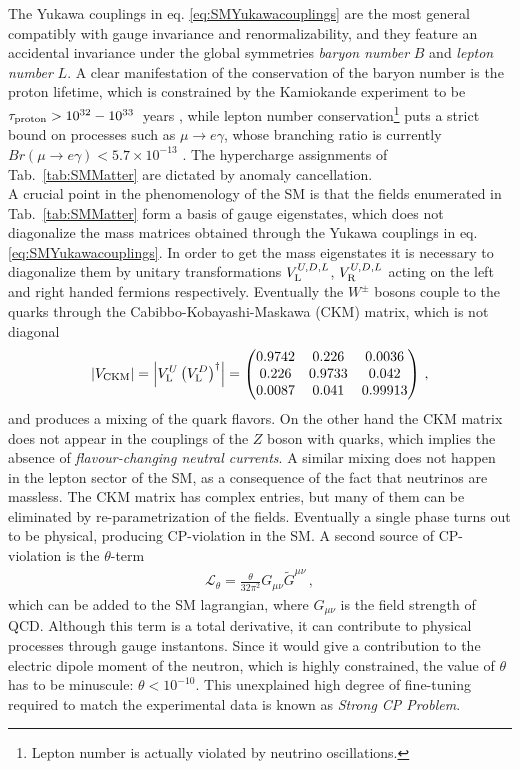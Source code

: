 \documentclass[12pt,a4paper]{book}
\begin{document}
The Yukawa couplings in eq. \eqref{eq:SMYukawacouplings} are the most general compatibly with gauge invariance and renormalizability, and they feature an accidental invariance under the global symmetries \textit{baryon number} $B$ and \textit{lepton number} $L$. A clear manifestation of the conservation of the baryon number is the proton lifetime, which is constrained by the Kamiokande experiment to be $\tau_{\rm proton} > 10^{32}-10^{33} \,$ years \cite{Hirata:1989kn}, while lepton number conservation\footnote{Lepton number is actually violated by neutrino oscillations.} puts a strict bound on processes such as $\mu \rightarrow e \gamma$, whose branching ratio is currently $Br(\mu \rightarrow e \gamma) < 5.7 \times 10^{-13}$ \cite{Adam:2013mnn}. The hypercharge assignments of Tab.~\ref{tab:SMMatter} are dictated by anomaly cancellation.\\

A crucial point in the phenomenology of the SM is that the fields enumerated in Tab.~\ref{tab:SMMatter} form a basis of gauge eigenstates, which does not diagonalize the mass matrices obtained through the Yukawa couplings in eq. \eqref{eq:SMYukawacouplings}. In order to get the mass eigenstates it is necessary to diagonalize them by unitary transformations $V_{\rm L}^{U, D, L}$, $V_{\rm R}^{U, D, L}$ acting on the left and right handed fermions respectively. Eventually the $W^\pm$ bosons couple to the quarks through the Cabibbo-Kobayashi-Maskawa (CKM) matrix, which is not diagonal
\begin{align}
\label{eq:CKM}
\left|V_{\rm CKM}\right| = \left|V^U_{\rm L} \left(V_{\rm L}^D\right)^\dagger \right| = \begin{pmatrix} 0.9742 & 0.226 & 0.0036 \\ 0.226 & 0.9733 & 0.042 \\ 0.0087 & 0.041 & 0.99913 \end{pmatrix}\,,
\end{align}
and produces a mixing of the quark flavors. On the other hand the CKM matrix does not appear in the couplings of the $Z$ boson with quarks, which implies the absence of \textit{flavour-changing neutral currents}. A similar mixing does not happen in the lepton sector of the SM, as a consequence of the fact that neutrinos are massless. The CKM matrix has complex entries, but many of them can be eliminated by re-parametrization of the fields. Eventually a single phase turns out to be physical, producing CP-violation in the SM. A second source of CP-violation is the $\theta$-term
\begin{align}
\label{eq:ThetaTerm}
\mathcal{L_{\theta}} = \frac{\theta}{32 \pi^2} G_{\mu \nu} \tilde{G}^{\mu \nu} \,,
\end{align}
which can be added to the SM lagrangian, where $G_{\mu \nu}$ is the field strength of QCD. Although this term is a total derivative, it can contribute to physical processes through gauge instantons. Since it would give a contribution to the electric dipole moment of the neutron, which is highly constrained, the value of $\theta$ has to be minuscule: $\theta < 10^{-10}$. This unexplained high degree of fine-tuning required to match the experimental data is known as \textit{Strong CP Problem}.
\end{document}
